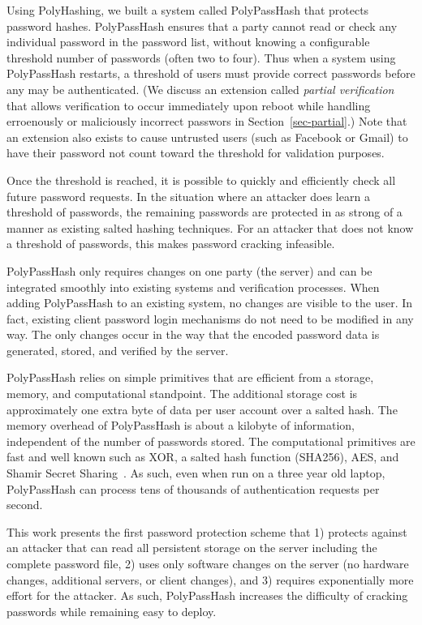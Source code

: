 Using PolyHashing, we built a system called PolyPassHash that 
protects password hashes.  PolyPassHash ensures that a party cannot 
read or check any individual password in the password list, without knowing
a configurable threshold number of passwords (often two to four).   Thus when 
a system using PolyPassHash restarts, a threshold of users must provide correct
passwords before any may be authenticated.   (We discuss an extension called
\emph{partial verification} that allows verification to occur immediately
upon reboot while handling erroenously or maliciously incorrect passwors
in Section~\ref{sec-partial}.)
Note that an extension also exists to cause untrusted users (such as 
Facebook or Gmail) to have their password not count toward the threshold for
validation purposes.    

Once the threshold is 
reached, it is possible to quickly and efficiently check all future password
requests.  
In the situation where an attacker does learn a threshold of passwords, the 
remaining passwords are 
protected in as strong of a manner as existing salted hashing 
techniques.  For an attacker that does not know a threshold of passwords, 
this makes password cracking infeasible.

PolyPassHash only requires changes on one party (the server) and can be 
integrated smoothly into existing systems and verification processes.  %
When adding PolyPassHash to an existing system, no changes are visible to 
the user.  In fact, existing
client password login mechanisms do not need to be modified in any way.   The
only changes occur in the way that the encoded password data is generated,
stored, and verified by the server.


PolyPassHash relies on simple primitives that are efficient from a storage, 
memory, and computational standpoint.   The additional storage cost is 
approximately one extra byte of data per user account over a salted 
hash.   The memory overhead of PolyPassHash is about a kilobyte of 
information, independent of the number of passwords stored.
The computational primitives are fast and well known
such as XOR, a salted hash function (SHA256), AES, and Shamir Secret 
Sharing~\cite{shamir1979share}.
As such, even when run on a three year old laptop, PolyPassHash can process 
tens of thousands of authentication requests per second.


This work presents the first password protection scheme that 1) protects 
against an attacker that can read all persistent storage on the server
including the complete password file, 
2) uses only software changes on the server (no hardware changes, 
additional servers, or client changes), and 3) requires exponentially more 
effort for the attacker.   
As such, PolyPassHash increases the difficulty
of cracking passwords while remaining easy to deploy.

